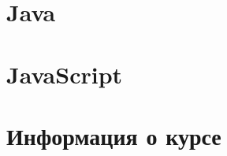 
\maketitle
\tableofcontents

\newpage
\section{Java}

\newpage
\section{JavaScript}

\newpage
\section{Информация о курсе}
